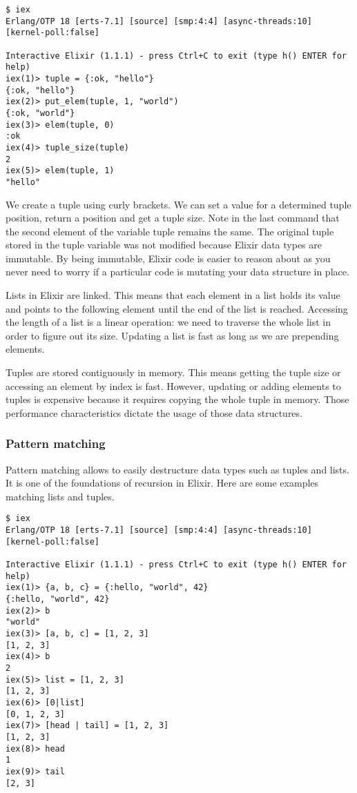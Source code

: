 \begin{verbatim}
$ iex
Erlang/OTP 18 [erts-7.1] [source] [smp:4:4] [async-threads:10] [kernel-poll:false]

Interactive Elixir (1.1.1) - press Ctrl+C to exit (type h() ENTER for help)
iex(1)> tuple = {:ok, "hello"}
{:ok, "hello"}
iex(2)> put_elem(tuple, 1, "world")
{:ok, "world"}
iex(3)> elem(tuple, 0)
:ok
iex(4)> tuple_size(tuple)
2
iex(5)> elem(tuple, 1)
"hello"
\end{verbatim}

We create a tuple using curly brackets. We can set a value for a determined
tuple position, return a position and get a tuple size. Note in the last command
that the second element of the variable tuple remains the same. The original
tuple stored in the tuple variable was not modified because Elixir data types
are immutable. By being immutable, Elixir code is easier to reason about as you
never need to worry if a particular code is mutating your data structure in
place.

Lists in Elixir are linked. This means that each element in a list holds its
value and points to the following element until the end of the list is reached.
Accessing the length of a list is a linear operation: we need to traverse the
whole list in order to figure out its size. Updating a list is fast as long as
we are prepending elements.

Tuples are stored contiguously in memory. This means getting the tuple size or
accessing an element by index is fast. However, updating or adding elements to
tuples is expensive because it requires copying the whole tuple in memory. Those
performance characteristics dictate the usage of those data structures.

\subsubsection{Pattern matching}

Pattern matching allows to easily destructure data types such as tuples and
lists. It is one of the foundations of recursion in Elixir. Here are some
examples matching lists and tuples.

\begin{verbatim}
$ iex
Erlang/OTP 18 [erts-7.1] [source] [smp:4:4] [async-threads:10] [kernel-poll:false]

Interactive Elixir (1.1.1) - press Ctrl+C to exit (type h() ENTER for help)
iex(1)> {a, b, c} = {:hello, "world", 42}
{:hello, "world", 42}
iex(2)> b
"world"
iex(3)> [a, b, c] = [1, 2, 3]
[1, 2, 3]
iex(4)> b
2
iex(5)> list = [1, 2, 3]
[1, 2, 3]
iex(6)> [0|list]
[0, 1, 2, 3]
iex(7)> [head | tail] = [1, 2, 3]
[1, 2, 3]
iex(8)> head
1
iex(9)> tail
[2, 3]
\end{verbatim}

